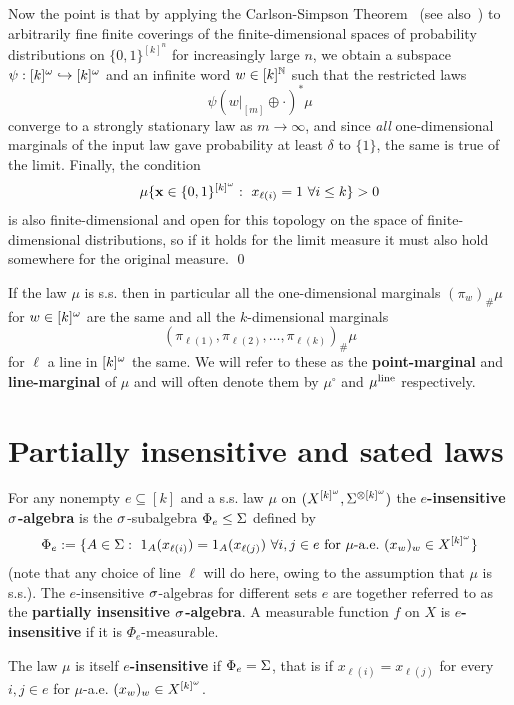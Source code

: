 \documentclass[11pt]{article}
\begin{document}
Now the point is that by
applying the Carlson-Simpson Theorem~\cite{CarSim84} (see also~\cite{FurKat89}) to arbitrarily
fine finite coverings of the finite-dimensional spaces of
probability distributions on $\{0,1\}^{[k]^n}$ for increasingly
large $n$, we obtain a subspace $\psi:[k]^\o \into [k]^\o$ and an
infinite word $w \in [k]^\bbN$ such that the restricted laws
\[\psi(w|_{[m]}\oplus \cdot)^\ast\mu\]
converge to a strongly stationary law as $m\to\infty$, and since
\emph{all} one-dimensional marginals of the input law gave
probability at least $\delta$ to $\{1\}$, the same is true of the
limit.  Finally, the condition
\[\mu\{\bf{x} \in \{0,1\}^{[k]^\o}:\ x_{\ell(i)} = 1\ \forall i\leq k\} > 0\]
is also finite-dimensional and open for this topology on the space
of finite-dimensional distributions, so if it holds for the limit
measure it must also hold somewhere for the original measure. \qed

\begin{dfn}
If the law $\mu$ is s.s. then in particular all the one-dimensional
marginals $(\pi_w)_\#\mu$ for $w \in [k]^\o$ are the same and all
the $k$-dimensional marginals
\[(\pi_{\ell(1)},\pi_{\ell(2)},\ldots,\pi_{\ell(k)})_\#\mu\]
for $\ell$ a line in $[k]^\o$ the same.  We will refer to these as
the \textbf{point-marginal} and \textbf{line-marginal} of $\mu$ and
will often denote them by $\mu^\circ$ and $\mu^\line$ respectively.
\end{dfn}

\section{Partially insensitive and sated
laws}\label{sec:insens}

\begin{dfn}
For any nonempty $e \subseteq [k]$ and a s.s. law $\mu$ on
$(X^{[k]^\o},\S^{\otimes [k]^\o})$ the \textbf{$e$-insensitive
$\s$-algebra} is the $\s$-subalgebra $\Phi_e \leq \S$ defined by
\[\Phi_e := \{A \in\S:\ 1_A(x_{\ell(i)}) = 1_A(x_{\ell(j)})\ \forall i,j\in e\ \hbox{for}\ \mu\hbox{-a.e.}\ (x_w)_w\in X^{[k]^\o}\}\]
(note that any choice of line $\ell$ will do here, owing to the assumption that $\mu$ is s.s.). The $e$-insensitive $\s$-algebras for different sets $e$ are
together referred to as the \textbf{partially insensitive
$\s$-algebra}.  A measurable function $f$ on $X$ is
\textbf{$e$-insensitive} if it is $\Phi_e$-measurable.

The law $\mu$ is itself \textbf{$e$-insensitive} if $\Phi_e = \S$,
that is if $x_{\ell(i)} = x_{\ell(j)}$ for every $i,j \in e$ for
$\mu$-a.e. $(x_w)_w\in X^{[k]^\o}$.
\end{dfn}
\end{document}
